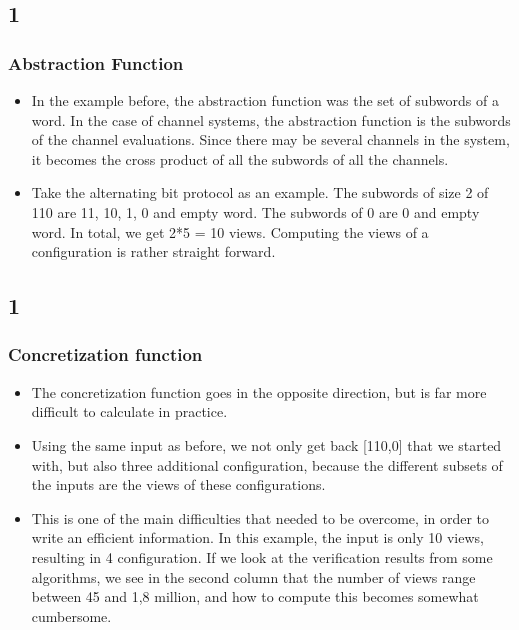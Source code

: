 \documentclass[handout]{beamer}
\begin{document}
\begin{footnotesize}
\subsection*{1}
\begin{frame}
  \frametitle{Abstraction Function}
  \begin{itemize}
  \item
  In the example before, the abstraction function was the set of subwords of a word. In the case of channel systems, the abstraction function is the subwords of the channel evaluations. Since there may be several channels in the system, it becomes the cross product of all the subwords of all the channels.
\item
  Take the alternating bit protocol as an example. The subwords of size 2 of 110 are 11, 10, 1, 0 and empty word. The subwords of 0 are 0 and empty word. In total, we get 2*5 = 10 views. Computing the views of a configuration is rather straight forward.

    \end{itemize}
\end{frame}

\subsection*{1}
\begin{frame}
  \frametitle{Concretization function}
  \begin{itemize}
  \item
  The concretization function goes in the opposite direction, but is far more difficult to calculate in practice.

  \item
  Using the same input as before, we not only get back [110,0] that we started with, but also three additional configuration, because the different subsets of the inputs are the views of these configurations.
\item
  This is one of the main difficulties that needed to be overcome, in order to write an efficient information. In this example, the input is only 10 views, resulting in 4 configuration. If we look at the verification results from some algorithms, we see in the second column that the number of views range between 45 and 1,8 million, and how to compute this becomes somewhat cumbersome.
  \end{itemize}
\end{frame}



\end{footnotesize}
\end{document}
